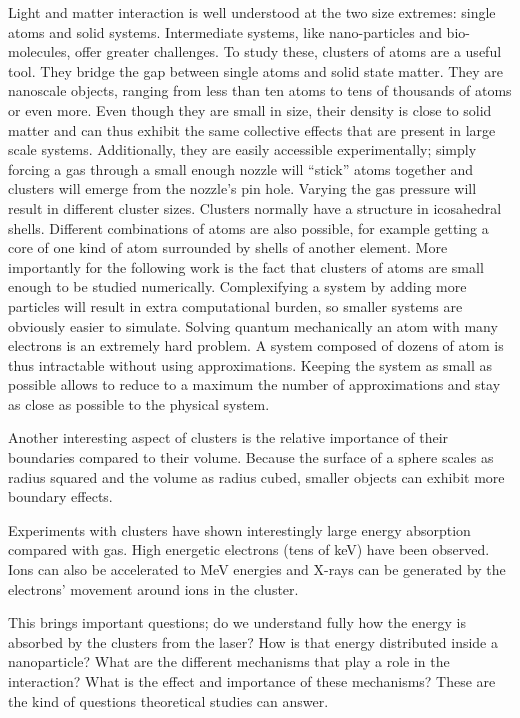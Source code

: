 Light and matter interaction is well understood at the two size extremes: 
single atoms and solid systems. Intermediate systems, like nano-particles and 
bio-molecules, offer greater challenges. To study these, clusters of atoms are 
a useful tool. They bridge the gap between single atoms and solid state 
matter. They are nanoscale objects, ranging from less than ten atoms to tens of 
thousands of atoms or even more. Even though they are small in size, their 
density is close to solid matter and can thus exhibit the same collective 
effects that are present in large scale systems. Additionally, they are easily 
accessible experimentally; simply forcing a gas through a small enough nozzle 
will ``stick'' atoms together and clusters will emerge from the nozzle's pin 
hole. Varying the gas pressure will result in different cluster sizes. 
Clusters normally have a structure in icosahedral shells.
Different combinations of atoms are also possible, for example getting a core of 
one kind of atom surrounded by shells of another element. More importantly for 
the following work is the fact that clusters of atoms are small enough to be 
studied numerically. Complexifying a system by adding more particles will 
result in extra computational burden, so smaller systems are obviously easier 
to simulate. Solving quantum mechanically an atom with many electrons is an 
extremely hard problem. A system composed of dozens of atom is thus intractable 
without using approximations. Keeping the system as small as possible allows to 
reduce to a maximum the number of approximations and stay as close as possible 
to the physical system.

Another interesting aspect of clusters is the relative importance of 
their boundaries compared to their volume. Because the surface of a sphere 
scales as radius squared and the volume as radius cubed, smaller objects can 
exhibit more boundary effects.

Experiments with clusters have shown interestingly large energy absorption 
compared with gas. High energetic electrons (tens of keV) have been observed. 
Ions can also be accelerated to MeV energies and X-rays can be generated by the 
electrons' movement around ions in the cluster.

This brings important questions; do we understand fully how the energy is 
absorbed by the clusters from the laser? How is that energy distributed 
inside a nanoparticle? What are the different mechanisms that play a role in 
the interaction? What is the effect and importance of these mechanisms? These 
are the kind of questions theoretical studies can answer.

